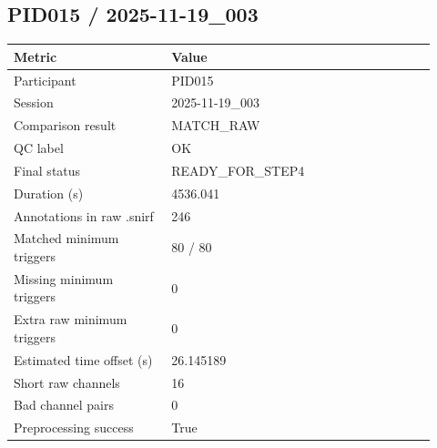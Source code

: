 \subsection*{PID015 / 2025-11-19\_003}
\begin{tabular}{p{0.34\linewidth}p{0.58\linewidth}}
\toprule
Metric & Value\\
\midrule
Participant & PID015\\
Session & 2025-11-19\_003\\
Comparison result & MATCH\_RAW\\
QC label & OK\\
Final status & READY\_FOR\_STEP4\\
Duration (s) & 4536.041\\
Annotations in raw .snirf & 246\\
Matched minimum triggers & 80 / 80\\
Missing minimum triggers & 0\\
Extra raw minimum triggers & 0\\
Estimated time offset (s) & 26.145189\\
Short raw channels & 16\\
Bad channel pairs & 0\\
Preprocessing success & True\\
\bottomrule
\end{tabular}
